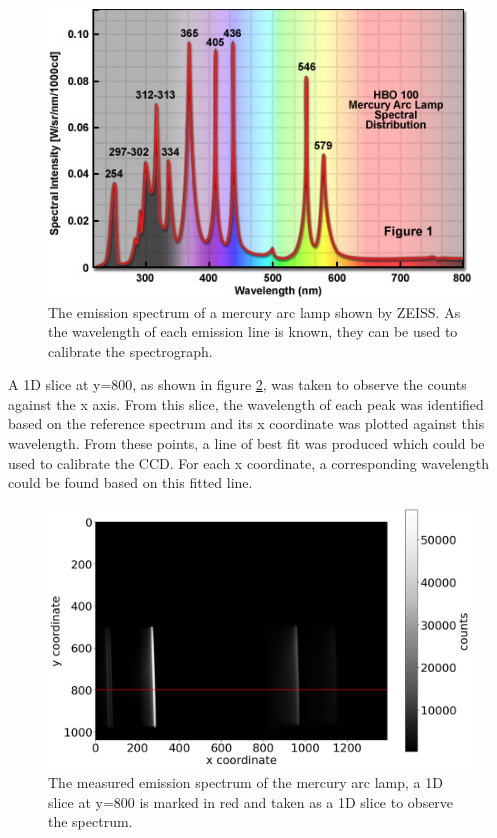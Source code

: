 \documentclass[a4paper,12pt,twocolumn]{article}
\let\cite=\supercite
\begin{document}
			\begin{figure}
				\includegraphics[width=\columnwidth]{mercurySpectrum.jpg}
				\captionsetup{font=scriptsize}
				\caption{The emission spectrum of a mercury arc lamp shown by ZEISS\cite{zeiss}. As the wavelength of each emission line is known, they can be used to calibrate the spectrograph.}
				\label{fig:mercury}
			\end{figure}
			
			A 1D slice at y=800, as shown in figure \ref{fig:Hg}, was taken to observe the counts against the x axis. From this slice, the wavelength of each peak was identified based on the reference spectrum and its x coordinate was plotted against this wavelength. From these points, a line of best fit was produced which could be used to calibrate the CCD. For each x coordinate, a corresponding wavelength could be found based on this fitted line.
			
			\begin{figure}
				\includegraphics[width=\columnwidth]{mercuryEmission.png}
				\captionsetup{font=scriptsize}
				\caption{The measured emission spectrum of the mercury arc lamp, a 1D slice at y=800 is marked in red and taken as a 1D slice to observe the spectrum.}
				\label{fig:Hg}
			\end{figure}
		
\end{document}
